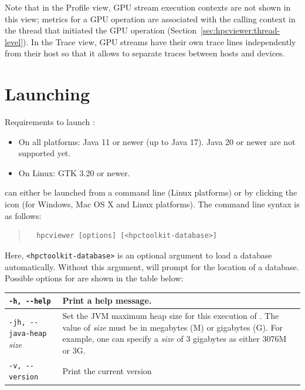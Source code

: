 Note that in the Profile view, GPU stream execution contexts are not shown in this view; metrics for a GPU operation are associated with the calling context in the thread that initiated the GPU operation (Section~\ref{sec:hpcviewer:thread-level}).
In the Trace view, GPU streams have their own trace lines independently from their host so that it allows to separate traces between hosts and devices.


\section{Launching}

Requirements to launch \hpcviewer:
\begin{itemize}
 \item On all platforms: Java 11 or newer (up to Java 17). Java 20 or newer are not supported yet.
 \item On Linux: GTK 3.20 or newer.
\end{itemize}

\hpcviewer{} can either be launched from a command line (Linux platforms) or by clicking the \hpcviewer{} icon (for Windows, Mac OS X and Linux platforms).
The command line syntax is as follows:
\begin{quote}
\begin{verbatim}
  hpcviewer [options] [<hpctoolkit-database>]
\end{verbatim}
\end{quote}
Here, \texttt{<hpctoolkit-database>} is an optional argument to load a database automatically.
Without this argument, \hpcviewer{} will prompt for the location of a database. Possible options for \hpcviewer{}  are shown in the table below:\\

\begin{centering}
\begin{tabular}{|l|p{4.1in}|}\hline\hline
 \verb|-h, --help|   &
 	Print a help message. \\\hline
 \verb|-jh, --java-heap| {\em size}  &
  	Set the JVM maximum heap size for this execution of  \hpcviewer{}. The value of {\em size} must be
	in megabytes (M) or gigabytes (G). For example, one can specify a {\em size}  of 3 gigabytes as either
	3076M or 3G.\\\hline
 \verb|-v, --version|   &
	Print the current version\\\hline\hline
 \end{tabular}
 \end{centering}
 \vspace{2ex}

